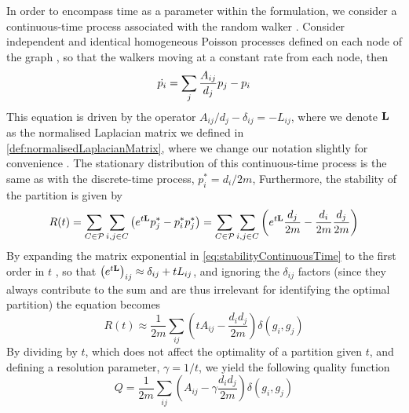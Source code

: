 In order to encompass time as a parameter within the formulation, we consider a continuous-time process associated with the random walker \cite{LDB08}.
Consider independent and identical homogeneous Poisson processes defined on each node of the graph \cite{LDB08}, so that the walkers moving at a constant rate from each node, then
\begin{equation}
	\label{eq:densityRandomWalkerContinuousTime}
	\dot{p_{i}} = \sum_{j} \frac{A_{ij}}{d_{j}} p_{j} - p_{i}
\end{equation}
This equation is driven by the operator $A_{ij}/d_{j} - \delta_{ij} = -L_{ij}$, where we denote $\mathbf L$ as the normalised Laplacian matrix we defined in \cref{def:normalisedLaplacianMatrix}, where we change our notation slightly for convenience \cite{MRM+10}.
The stationary distribution of this continuous-time process is the same as with the discrete-time process, $p_{i}^{*} = d_{i}/2m$,
Furthermore, the stability of the partition is given by
\begin{equation}
	\label{eq:stabilityContinuousTime}
	R(t) = \sum_{C \in \mathcal P} \sum_{i,j \in C} \left( e^{t \mathbf L} p_{j}^{*} - p_{i}^{*} p_{j}^{*} \right) = \sum_{C \in \mathcal P} \sum_{i,j \in C} \left( e^{t \mathbf L} \frac{d_{j}}{2m} - \frac{d_{i}}{2m} \frac{d_{j}}{2m} \right)
\end{equation}
By expanding the matrix exponential in \cref{eq:stabilityContinuousTime} to the first order in $t$ \cite{LDB08}, so that $\left( e^{t \mathbf L} \right)_{ij} \approx \delta_{ij} + tL_{ij}$, and ignoring the $\delta_{ij}$ factors (since they always contribute to the sum and are thus irrelevant for identifying the optimal partition) the equation becomes
\begin{equation}
	\label{eq:stabilityContinuousTimeApproximation}
	R(t) \approx \frac{1}{2m} \sum_{ij} \left( tA_{ij} - \frac{d_{i}d_{j}}{2m} \right) \delta(g_{i},g_{j})
\end{equation}
By dividing by $t$, which does not affect the optimality of a partition given $t$, and defining a resolution parameter, $\gamma = 1/t$, we yield the following quality function
\begin{equation}
	\label{eq:modularityFromStabilityContinuousTimeApproximation}
	Q = \frac{1}{2m} \sum_{ij} \left( A_{ij} - \gamma \frac{d_{i}d_{j}}{2m} \right) \delta(g_{i},g_{j})
\end{equation}


